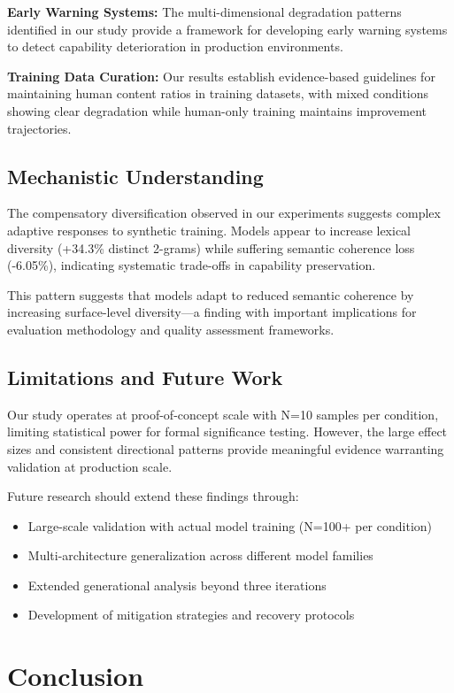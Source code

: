 \documentclass[letterpaper]{article}
\begin{document}
\textbf{Early Warning Systems:} The multi-dimensional degradation patterns identified in our study provide a framework for developing early warning systems to detect capability deterioration in production environments.

\textbf{Training Data Curation:} Our results establish evidence-based guidelines for maintaining human content ratios in training datasets, with mixed conditions showing clear degradation while human-only training maintains improvement trajectories.

\subsection{Mechanistic Understanding}

The compensatory diversification observed in our experiments suggests complex adaptive responses to synthetic training. Models appear to increase lexical diversity (+34.3\% distinct 2-grams) while suffering semantic coherence loss (-6.05\%), indicating systematic trade-offs in capability preservation.

This pattern suggests that models adapt to reduced semantic coherence by increasing surface-level diversity—a finding with important implications for evaluation methodology and quality assessment frameworks.

\subsection{Limitations and Future Work}

Our study operates at proof-of-concept scale with N=10 samples per condition, limiting statistical power for formal significance testing. However, the large effect sizes and consistent directional patterns provide meaningful evidence warranting validation at production scale.

Future research should extend these findings through:
\begin{itemize}
\item Large-scale validation with actual model training (N=100+ per condition)
\item Multi-architecture generalization across different model families
\item Extended generational analysis beyond three iterations
\item Development of mitigation strategies and recovery protocols
\end{itemize}

\section{Conclusion}
\end{document}
